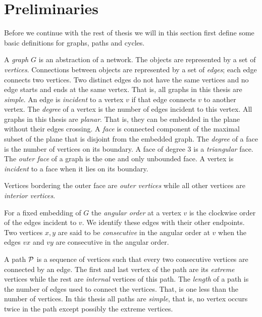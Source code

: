 
\section{Preliminaries}
\thispagestyle{plain}
\label{s:prelim}

Before we continue with the rest of thesis we will in this section first define some basic definitions for graphs, paths and cycles.

  A \emph{graph} $G$ is an abstraction of a network. The objects are represented by a set of \emph{vertices}.
  Connections between objects are represented by a set of \emph{edges}; each edge connects two vertices.
  Two distinct edges do not have the same vertices and no edge starts and ends at the same vertex.
  That is, all graphs in this thesis are \emph{simple}.
  An edge is \emph{incident} to a vertex $v$ if that edge connects $v$ to another vertex.
  The \emph{degree} of a vertex is the number of edges incident to this vertex.
  All graphs in this thesis are \emph{planar}.
  That is, they can be embedded in the plane without their edges crossing. A \emph{face} is connected component of the maximal subset of the plane that is disjoint from the embedded graph. The \emph{degree} of a face is the number of vertices on its boundary.
  A face of degree $3$ is a \emph{triangular} face. The \emph{outer face} of a graph is the one and only unbounded face.
  A vertex is \emph{incident} to a face when it lies on its boundary.

  Vertices bordering the outer face are \emph{outer vertices} while all other vertices are \emph{interior vertices}.

  For a fixed embedding of $G$ the \emph{angular order} at a vertex $v$ is the clockwise order of the edges incident to $v$. We identify these edges with their other endpoints.
  Two vertices $x, y$ are said to be \emph{consecutive} in the angular order at $v$ when the edges $vx$ and $vy$ are consecutive in the angular order.


  A path $\P$ is a sequence of vertices such that every two consecutive vertices are connected by an edge. The first and last vertex of the path are its \emph{extreme} vertices while the rest are \emph{internal} vertices of this path. The \emph{length} of a path is the number of edges used to connect the vertices. That, is one less than the number of vertices. In this thesis all paths are \emph{simple}, that is, no vertex occurs twice in the path except possibly the extreme vertices.

